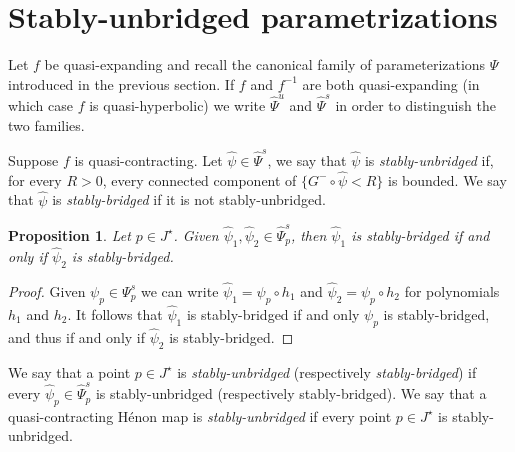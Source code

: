 \documentclass[10pt,a4paper]{article}
\newtheorem{proposition}[theorem]{Proposition}
\newenvironment{definition}[1][Definition]{\begin{trivlist}
\item[\hskip \labelsep {\bfseries #1}]}{\end{trivlist}}
\begin{document}
\section{Stably-unbridged parametrizations}\label{section:unbridged}

Let $f$ be quasi-expanding and recall the canonical family of parameterizations $\Psi$ introduced in the previous section. If $f$ and $f^{-1}$ are both quasi-expanding (in which case $f$ is quasi-hyperbolic) we write $\widehat\Psi^u$ and $\widehat\Psi^s$ in order to distinguish the two families.

\begin{definition}
Suppose $f$ is quasi-contracting. Let $\widehat\psi\in\widehat\Psi^s$, we say that $\widehat\psi$ is \textit{stably-unbridged} if, for every $R>0$, every connected component of $\{G^-\circ\widehat\psi<R\}$ is bounded. We say that $\widehat\psi$ is \textit{stably-bridged} if it is not stably-unbridged.
\end{definition}

\begin{proposition}
Let $p\in J^\star$. Given $\widehat\psi_1,\widehat\psi_2\in\widehat \Psi_p^s$, then $\widehat\psi_1$ is stably-bridged if and only if $\widehat\psi_2$ is stably-bridged.
\end{proposition}
\begin{proof}
Given $\psi_p \in \Psi^s_p$ we can write $\widehat\psi_{1} = \psi_p \circ h_{1}$ and $\widehat{\psi}_2 = \psi_p \circ h_2$ for polynomials $h_1$ and $h_2$. It follows that $\widehat\psi_1$ is stably-bridged if and only $\psi_p$ is stably-bridged, and thus if and only if $\widehat\psi_2$ is stably-bridged.
\end{proof}
\begin{definition}
We say that a point $p\in J^\star$ is \textit{stably-unbridged} (respectively \textit{stably-bridged}) if every $\widehat\psi_p\in\widehat\Psi^s_p$ is stably-unbridged (respectively stably-bridged). We say that a quasi-contracting H\'enon map is \textit{stably-unbridged} if every point $p\in J^\star$ is stably-unbridged.
\end{definition}
\end{document}
